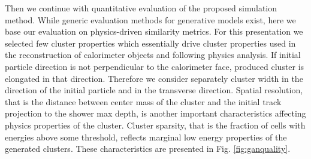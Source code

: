\documentclass{PoS}
\begin{document}
Then we continue with quantitative evaluation of the proposed
simulation method. While generic evaluation methods for generative
models exist, 
here we base our evaluation on
physics-driven similarity metrics. For this presentation we selected
few cluster properties which essentially drive cluster properties used
in the reconstruction of calorimeter objects and following physics
analysis. If initial particle direction is not perpendicular to the
calorimeter face, produced cluster is elongated in that direction. 
Therefore we consider separately cluster width in the direction of the
initial particle and in the transverse direction. 
Spatial resolution, that is the distance between center mass of the
cluster and the initial track projection to the shower max depth, is
another important characteristics affecting physics properties of the
cluster.
 Cluster sparsity, that is the fraction of cells with energies above
 some threshold, reflects marginal low energy properties of the
 generated clusters. 
These characteristics are presented in Fig. \ref{fig:ganquality}.
\end{document}
